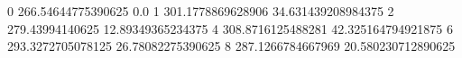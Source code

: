 0 266.54644775390625 0.0
1 301.1778869628906 34.631439208984375
2 279.43994140625 12.89349365234375
4 308.8716125488281 42.325164794921875
6 293.3272705078125 26.78082275390625
8 287.1266784667969 20.580230712890625
